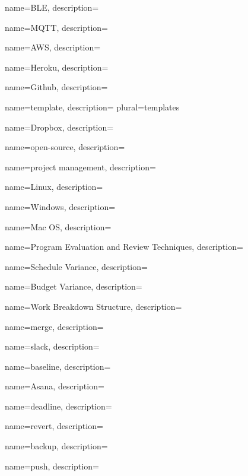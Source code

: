  {
	name=BLE,
	description={\TODO{}}
}

 {
	name=MQTT,
	description={\TODO{}}
}

 {
	name=AWS,
	description={\TODO{}}
}

 {
	name=Heroku,
	description={\TODO{}}
}

 {
	name=Github,
	description={\TODO{}}
}

 {
	name=template,
	description={\TODO{}}
	plural=templates
}

 {
	name=Dropbox,
	description={\TODO{}}
}

 {
	name=open-source,
	description={\TODO{}}
}

 {
	name=project management,
	description={\TODO{}}
}

 {
	name=Linux,
	description={\TODO{}}
}

 {
	name=Windows,
	description={\TODO{}}
}

 {
	name=Mac OS,
	description={\TODO{}}
}

 {
	name=Program Evaluation and Review Techniques,
	description={\TODO{}}
}

 {
	name=Schedule Variance,
	description={\TODO{}}
}

 {
	name=Budget Variance,
	description={\TODO{}}
}

 {
	name=Work Breakdown Structure,
	description={\TODO{}}
}

 {
	name=merge,
	description={\TODO{}}
}

 {
	name=slack,
	description={\TODO{}}
}

 {
	name=baseline,
	description={\TODO{}}
}

 {
	name=Asana,
	description={\TODO{}}
}

 {
	name=deadline,
	description={\TODO{}}
}

 {
	name=revert,
	description={\TODO{}}
}

 {
	name=backup,
	description={\TODO{}}
}

 {
	name=push,
	description={\TODO{}}
}